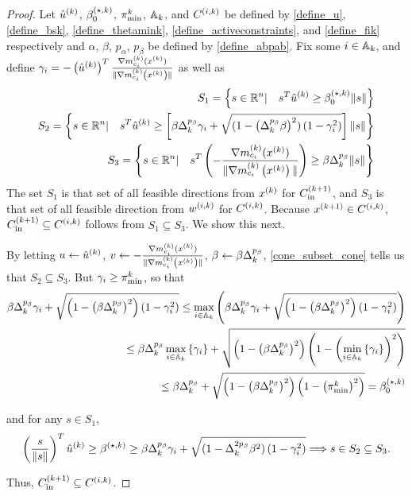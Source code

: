 \begin{proof}
Let 
${{\hat u}^{(k)}}$, ${\beta_0^{(\star, k)}}$, ${\pi^k_{\textrm{min}}}$, ${\mathbb A_{k}}$, and ${C^{(i, k)}}$
be defined by
\cref{define_u}, \cref{define_bsk}, \cref{define_thetamink}, \cref{define_activeconstraints}, and \cref{define_fik} 
respectively and $\alpha$, $\beta$, $p_{\alpha}$, $p_{\beta}$ be defined by \cref{define_abpab}.
Fix some $i \in {\mathbb A_{k}}$, and define $\gamma_i = -\left({{\hat u}^{(k)}}\right)^T{\frac{\nabla m^{(k)}_{c_i}(x^{(k)})}{\|\nabla m^{(k)}_{c_i}\left(x^{(k)}\right)\|}}$ as well as
\begin{align*}
S_1 = \left\{s\in\mathbb R^n | \quad s^T{{\hat u}^{(k)}}\ge{\beta_0^{(\star, k)}}\|s\| \right\} \\
S_2 = \left\{s\in\mathbb R^n | \quad s^T{{\hat u}^{(k)}}\ge\left[\beta\Delta_k^{p_{\beta}}\gamma_i + \sqrt{(1 - \left(\Delta_k^{p_{\beta}}\beta\right)^2)\left(1 - \gamma_i^2\right)}\right]\|s\| \right\} \\
S_3 = \left\{s\in\mathbb R^n | \quad s^T\left(-{\frac{\nabla m^{(k)}_{c_i}(x^{(k)})}{\|\nabla m^{(k)}_{c_i}\left(x^{(k)}\right)\|}}\right)\ge\beta\Delta_k^{p_{\beta}}\|s\| \right\}
\end{align*}
The set $S_1$ is that set of all feasible directions from $x^{(k)}$ for ${C^{(k+1)}_{\textrm{in}}}$, and $S_3$ is that set of all feasible direction from ${w^{(i, k)}}$ for ${C^{(i, k)}}$.
Because ${{x}^{(k+1)}} \in {C^{(i, k)}}$, ${C^{(k+1)}_{\textrm{in}}} \subseteq {C^{(i, k)}}$ follows from $S_1 \subseteq S_3$.
We show this next.


By letting $u \gets {{\hat u}^{(k)}}$, $v \gets -{\frac{\nabla m^{(k)}_{c_i}(x^{(k)})}{\|\nabla m^{(k)}_{c_i}\left(x^{(k)}\right)\|}}$, $\beta \gets \beta \Delta_k^{p_{\beta}}$, \cref{cone_subset_cone} tells us that
$S_2 \subseteq S_3$.
But $\gamma_i \ge {\pi^k_{\textrm{min}}}$, so that
\begin{align*}
\beta\Delta_k^{p_{\beta}}\gamma_i + \sqrt{\left(1 - \left(\beta\Delta_k^{p_{\beta}}\right)^2\right)\left(1 - \gamma_i^2\right)}
\le \max_{i\in{\mathbb A_{k}}} \left(\beta\Delta_k^{p_{\beta}}\gamma_i + \sqrt{\left(1 - \left(\beta\Delta_k^{p_{\beta}}\right)^2\right)\left(1 - \gamma_i^2\right)}\right) \\
\le \beta\Delta_k^{p_{\beta}} \max_{i\in{\mathbb A_{k}}}\left\{\gamma_i\right\} + \sqrt{\left(1 - \left(\beta\Delta_k^{p_{\beta}}\right)^2\right)\left(1 - \left(\min_{i\in{\mathbb A_{k}}}\left\{\gamma_i\right\}\right)^2\right)} \\
\le \beta\Delta_k^{p_{\beta}} + \sqrt{\left(1 - \left(\beta\Delta_k^{p_{\beta}}\right)^2\right)\left(1 - \left({\pi^k_{\textrm{min}}}\right)^2\right)} = {\beta_0^{(\star, k)}}
\end{align*}

and for any $s\in S_1$,
\begin{align*}
\left(\frac{s}{\|s\|}\right)^T{{\hat u}^{(k)}} \ge {\beta^{(\star, k)}} 
\ge \beta\Delta_k^{p_{\beta}}\gamma_i + \sqrt{(1 - \Delta_k^{2p_{\beta}}\beta^2)\left(1 - \gamma_i^2\right)}
\Longrightarrow s \in S_2 \subseteq S_3.
\end{align*}

Thus, ${C^{(k+1)}_{\textrm{in}}} \subseteq {C^{(i, k)}}$.
\end{proof}


